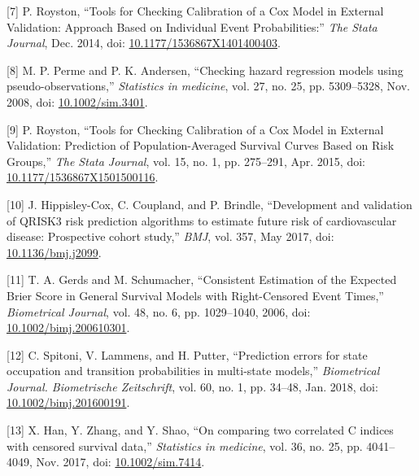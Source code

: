 \documentclass[12pt,PhD,twoside,openright]{muthesis}
\newenvironment{cslreferences}%
  {}%
  {\par}
\begin{document}
\begin{cslreferences}
\leavevmode\hypertarget{ref-royston_tools_2014}{}%
{[}7{]} P. Royston, ``Tools for Checking Calibration of a Cox Model in External Validation: Approach Based on Individual Event Probabilities:'' \emph{The Stata Journal}, Dec. 2014, doi: \href{https://doi.org/10.1177/1536867X1401400403}{10.1177/1536867X1401400403}.

\leavevmode\hypertarget{ref-perme_checking_2008}{}%
{[}8{]} M. P. Perme and P. K. Andersen, ``Checking hazard regression models using pseudo-observations,'' \emph{Statistics in medicine}, vol. 27, no. 25, pp. 5309--5328, Nov. 2008, doi: \href{https://doi.org/10.1002/sim.3401}{10.1002/sim.3401}.

\leavevmode\hypertarget{ref-royston_tools_2015}{}%
{[}9{]} P. Royston, ``Tools for Checking Calibration of a Cox Model in External Validation: Prediction of Population-Averaged Survival Curves Based on Risk Groups,'' \emph{The Stata Journal}, vol. 15, no. 1, pp. 275--291, Apr. 2015, doi: \href{https://doi.org/10.1177/1536867X1501500116}{10.1177/1536867X1501500116}.

\leavevmode\hypertarget{ref-hippisley-cox_development_2017}{}%
{[}10{]} J. Hippisley-Cox, C. Coupland, and P. Brindle, ``Development and validation of QRISK3 risk prediction algorithms to estimate future risk of cardiovascular disease: Prospective cohort study,'' \emph{BMJ}, vol. 357, May 2017, doi: \href{https://doi.org/10.1136/bmj.j2099}{10.1136/bmj.j2099}.

\leavevmode\hypertarget{ref-gerds_consistent_2006}{}%
{[}11{]} T. A. Gerds and M. Schumacher, ``Consistent Estimation of the Expected Brier Score in General Survival Models with Right-Censored Event Times,'' \emph{Biometrical Journal}, vol. 48, no. 6, pp. 1029--1040, 2006, doi: \href{https://doi.org/10.1002/bimj.200610301}{10.1002/bimj.200610301}.

\leavevmode\hypertarget{ref-spitoni_prediction_2018}{}%
{[}12{]} C. Spitoni, V. Lammens, and H. Putter, ``Prediction errors for state occupation and transition probabilities in multi-state models,'' \emph{Biometrical Journal. Biometrische Zeitschrift}, vol. 60, no. 1, pp. 34--48, Jan. 2018, doi: \href{https://doi.org/10.1002/bimj.201600191}{10.1002/bimj.201600191}.

\leavevmode\hypertarget{ref-han_comparing_2017}{}%
{[}13{]} X. Han, Y. Zhang, and Y. Shao, ``On comparing two correlated C indices with censored survival data,'' \emph{Statistics in medicine}, vol. 36, no. 25, pp. 4041--4049, Nov. 2017, doi: \href{https://doi.org/10.1002/sim.7414}{10.1002/sim.7414}.


\end{cslreferences}
\end{document}
